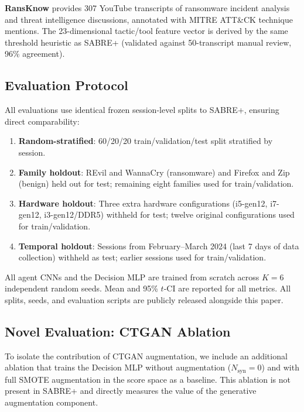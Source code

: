 \documentclass[journal]{IEEEtran}
\newcommand{\Nsynth}{N_{\mathrm{syn}}}
\begin{document}
\textbf{RansKnow} \cite{ransknow_2026} provides 307 YouTube transcripts
of ransomware incident analysis and threat intelligence discussions,
annotated with MITRE ATT\&CK technique mentions.
The 23-dimensional tactic/tool feature vector is derived by the same
threshold heuristic as SABRE+ (validated against 50-transcript manual
review, 96\% agreement).

\subsection{Evaluation Protocol}

All evaluations use identical frozen session-level splits to SABRE+,
ensuring direct comparability:

\begin{enumerate}
  \item \textbf{Random-stratified}: 60/20/20 train/validation/test split
        stratified by session.
  \item \textbf{Family holdout}: REvil and WannaCry (ransomware) and
        Firefox and Zip (benign) held out for test; remaining eight families
        used for train/validation.
  \item \textbf{Hardware holdout}: Three extra hardware configurations
        (i5-gen12, i7-gen12, i3-gen12/DDR5) withheld for test; twelve
        original configurations used for train/validation.
  \item \textbf{Temporal holdout}: Sessions from February--March 2024
        (last 7 days of data collection) withheld as test; earlier
        sessions used for train/validation.
\end{enumerate}

All agent CNNs and the Decision MLP are trained from scratch across
$K = 6$ independent random seeds.
Mean and 95\% $t$-CI are reported for all metrics.
All splits, seeds, and evaluation scripts are publicly released alongside
this paper.

\subsection{Novel Evaluation: CTGAN Ablation}

To isolate the contribution of CTGAN augmentation, we include an
additional ablation that trains the Decision MLP without augmentation
($\Nsynth = 0$) and with full SMOTE augmentation in the score space
as a baseline.
This ablation is not present in SABRE+ and directly measures the value
of the generative augmentation component.
\end{document}
